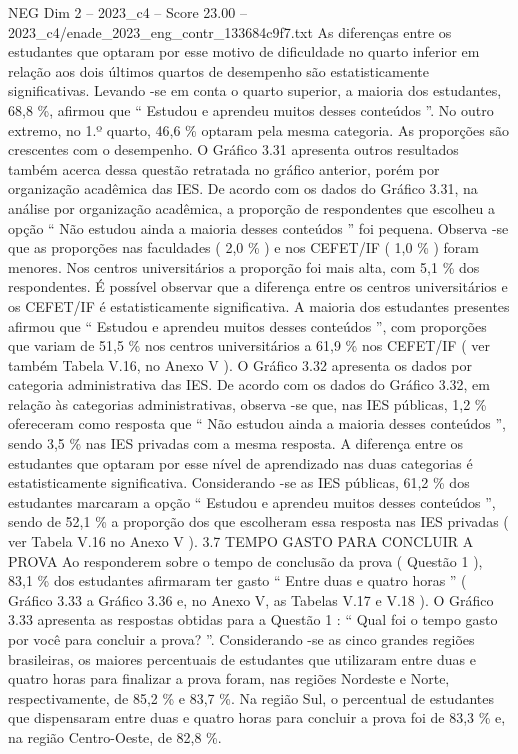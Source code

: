 \begin{textsample}{NEG Dim 2 – 2023\_c4 – Score 23.00 – 2023\_c4/enade\_2023\_eng\_contr\_133684c9f7.txt}
As diferenças entre os estudantes que optaram por esse motivo de dificuldade no quarto inferior em relação aos dois últimos quartos de desempenho são estatisticamente significativas.
Levando -se em conta o quarto superior, a maioria dos estudantes, 68,8 \%, afirmou que “ Estudou e aprendeu muitos desses conteúdos ”.
No outro extremo, no 1.º quarto, 46,6 \% optaram pela mesma categoria.
As proporções são crescentes com o desempenho.
O Gráfico 3.31 apresenta outros resultados também acerca dessa questão retratada no gráfico anterior, porém por organização acadêmica das IES.
De acordo com os dados do Gráfico 3.31, na análise por organização acadêmica, a proporção de respondentes que escolheu a opção “ Não estudou ainda a maioria desses conteúdos ” foi pequena.
Observa -se que as proporções nas faculdades ( 2,0 \% ) e nos CEFET/IF ( 1,0 \% ) foram menores.
Nos centros universitários a proporção foi mais alta, com 5,1 \% dos respondentes.
É possível observar que a diferença entre os centros universitários e os CEFET/IF é estatisticamente significativa.
A maioria dos estudantes presentes afirmou que “ Estudou e aprendeu muitos desses conteúdos ”, com proporções que variam de 51,5 \% nos centros universitários a 61,9 \% nos CEFET/IF ( ver também Tabela V.16, no Anexo V ).
O Gráfico 3.32 apresenta os dados por categoria administrativa das IES.
De acordo com os dados do Gráfico 3.32, em relação às categorias administrativas, observa -se que, nas IES públicas, 1,2 \% ofereceram como resposta que “ Não estudou ainda a maioria desses conteúdos ”, sendo 3,5 \% nas IES privadas com a mesma resposta.
A diferença entre os estudantes que optaram por esse nível de aprendizado nas duas categorias é estatisticamente significativa.
Considerando -se as IES públicas, 61,2 \% dos estudantes marcaram a opção “ Estudou e aprendeu muitos desses conteúdos ”, sendo de 52,1 \% a proporção dos que escolheram essa resposta nas IES privadas ( ver Tabela V.16 no Anexo V ). 3.7 TEMPO GASTO PARA CONCLUIR A PROVA Ao responderem sobre o tempo de conclusão da prova ( Questão 1 ), 83,1 \% dos estudantes afirmaram ter gasto “ Entre duas e quatro horas ” ( Gráfico 3.33 a Gráfico 3.36 e, no Anexo V, as Tabelas V.17 e V.18 ).
O Gráfico 3.33 apresenta as respostas obtidas para a Questão 1 : “ Qual foi o tempo gasto por você para concluir a prova? ”.
Considerando -se as cinco grandes regiões brasileiras, os maiores percentuais de estudantes que utilizaram entre duas e quatro horas para finalizar a prova foram, nas regiões Nordeste e Norte, respectivamente, de 85,2 \% e 83,7 \%.
Na região Sul, o percentual de estudantes que dispensaram entre duas e quatro horas para concluir a prova foi de 83,3 \% e, na região Centro-Oeste, de 82,8 \%.

\end{textsample}
